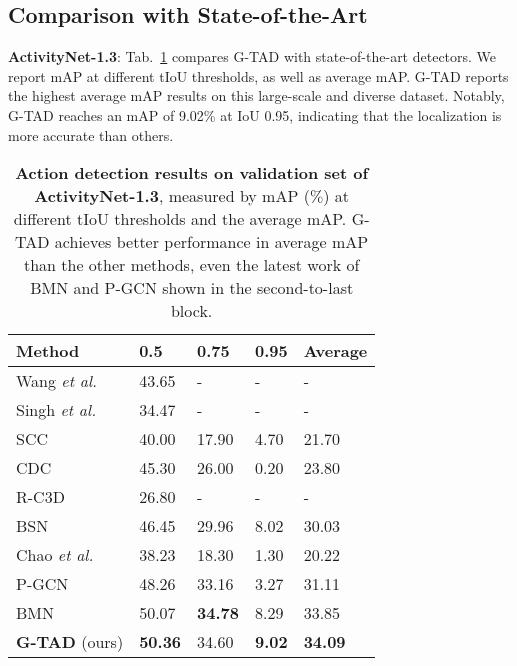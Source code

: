 \documentclass[10pt,twocolumn,letterpaper]{article}
\begin{document}
\subsection{Comparison with State-of-the-Art}

\noindent
{\bf ActivityNet-1.3}: Tab.~\ref{tab:sota_anet} compares G-TAD with state-of-the-art detectors. We report mAP at different tIoU thresholds, as well as average mAP. G-TAD reports the highest average mAP results on this large-scale and diverse dataset. Notably, G-TAD reaches an mAP of 9.02\% at IoU 0.95, indicating that the localization is more accurate than others.





\begin{table}[tbp]
\centering
\caption{\textbf{Action detection results on validation set of ActivityNet-1.3}, measured by mAP ($\%$) at different tIoU thresholds and the average mAP. G-TAD achieves better performance in average mAP than the other methods, even the latest work of BMN and P-GCN shown in the  second-to-last block. 
}
\small
\begin{tabular}{p{2.1cm}p{0.62cm}<{\centering}p{0.62cm}<{\centering}p{0.62cm}<{\centering}p{0.9cm}<{\centering}}
\toprule
Method  & 0.5  &  0.75  & 0.95 & Average\\
\hline
Wang \textit{et al.} \cite{wang2016uts}    & 43.65 & -  & - & -\\
Singh \textit{et al.} \cite{singh2016untrimmed} & 34.47 & - & - & - \\
SCC \cite{heilbron2017scc}   & 40.00 & 17.90  & 4.70   & 21.70  \\
CDC \cite{shou2017cdc} & 45.30 & 26.00 & 0.20 & 23.80 \\
R-C3D \cite{xu2017r} & 26.80 & - & - & - \\
BSN \cite{lin2018bsn} & 46.45  & 29.96 & 8.02  & 30.03  \\
Chao \textit{et al.} \cite{chao2018rethinking} & 38.23 & 18.30 & 1.30 & 20.22 \\ \hline
P-GCN \cite {zeng2019graph} &48.26 &33.16 &3.27 &31.11  \\
BMN \cite{lin2019bmn} & { 50.07} & \textbf{34.78} & { 8.29} & { 33.85}  \\
\hline
\textbf{G-TAD} (ours)  & \textbf{50.36} & {34.60} & \textbf{9.02} & {\bf 34.09} \\
\bottomrule
\end{tabular}
\label{tab:sota_anet}
\end{table}
\end{document}

